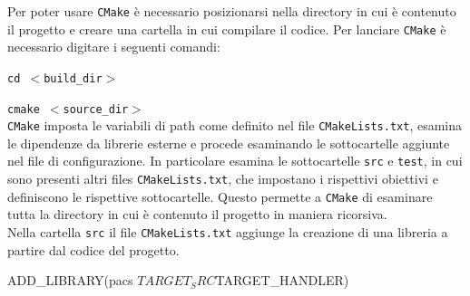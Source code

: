 
Per poter usare \texttt{CMake} è necessario posizionarsi nella directory in cui è contenuto il progetto e creare una cartella in cui compilare il codice. Per lanciare \texttt{CMake} è necessario digitare i seguenti comandi: \\ 

\par  \texttt{cd $<$build\_dir$>$ } 
\par \texttt{cmake $<$source\_dir$>$}\\

\noindent \texttt{CMake} imposta le variabili di path come definito nel file  \texttt{CMakeLists.txt}, esamina le dipendenze da librerie esterne e procede esaminando le sottocartelle aggiunte nel file di configurazione. In particolare esamina le sottocartelle \texttt{src} e \texttt{test}, in cui sono presenti altri files  \texttt{CMakeLists.txt}, che impostano i rispettivi obiettivi e definiscono le rispettive sottocartelle. Questo permette a \texttt{CMake} di esaminare tutta la directory in cui è contenuto il progetto in maniera ricorsiva. \\
Nella cartella \texttt{src} il file  \texttt{CMakeLists.txt} aggiunge la creazione di una libreria a partire dal codice del progetto. \\
\begin{Code03_01}
ADD_LIBRARY(pacs ${TARGET_SRC} ${TARGET_HANDLER})
\end{Code03_01}

